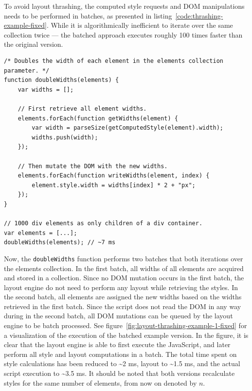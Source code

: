 \documentclass[a4paper,11pt]{kth-mag}
\newcommand{\code}[1]{\texttt{#1}}
\begin{document}
        To avoid layout thrashing, the computed style requests and \gls{DOM} manipulations needs to be performed in batches, as presented in listing~\ref{code:thrashing-example-fixed}.
        While it is algorithmically inefficient to iterate over the same collection twice --- the batched approach executes roughly 100 times faster than the original version.
        \begin{lstlisting}[caption={Example of avoiding layout thrashing by batch processing reads and writes to the \gls{DOM}. The code reads and double the widths of 1000 \glspl{element} in \textasciitilde7 ms.}, captionpos=b, label={code:thrashing-example-fixed}]
/* Doubles the width of each element in the elements collection parameter. */
function doubleWidths(elements) {
    var widths = [];

    // First retrieve all element widths.
    elements.forEach(function getWidths(element) {
        var width = parseSize(getComputedStyle(element).width);
        widths.push(width);
    });

    // Then mutate the DOM with the new widths.
    elements.forEach(function writeWidths(element, index) {
        element.style.width = widths[index] * 2 + "px";
    });
}

// 1000 div elements as only children of a div container.
var elements = [...];
doubleWidths(elements); // ~7 ms
        \end{lstlisting}
        Now, the \code{doubleWidths} function performs two batches that both iterations over the elements collection.
        In the first batch, all widths of all elements are acquired and stored in a collection.
        Since no \gls{DOM} mutation occurs in the first batch, the layout engine do not need to perform any layout while retrieving the styles.
        In the second batch, all elements are assigned the new widths based on the widths retrieved in the first batch.
        Since the script does not read the \gls{DOM} in any way during in the second batch, all \gls{DOM} mutations can be queued by the layout engine to be batch processed.
        See figure~\ref{fig:layout-thrashing-example-1-fixed} for a visualization of the execution of the batched example version.
        In the figure, it is clear that the layout engine is able to first execute the JavaScript, and later perform all style and layout computations in a batch.
        The total time spent on style calculations has been reduced to \textasciitilde2 ms, layout to \textasciitilde1.5 ms, and the actual script execution to \textasciitilde3.5 ms.
        It should be noted that both versions recalculate styles for the same number of elements, from now on denoted by $n$.
\end{document}
